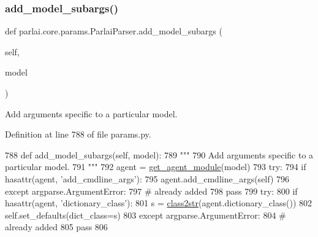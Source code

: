 \subsubsection{\texorpdfstring{add\+\_\+model\+\_\+subargs()}{add\_model\_subargs()}}
{\footnotesize\ttfamily def parlai.\+core.\+params.\+Parlai\+Parser.\+add\+\_\+model\+\_\+subargs (\begin{DoxyParamCaption}\item[{}]{self,  }\item[{}]{model }\end{DoxyParamCaption})}

\begin{DoxyVerb}Add arguments specific to a particular model.
\end{DoxyVerb}
 

Definition at line 788 of file params.\+py.


\begin{DoxyCode}
788     \textcolor{keyword}{def }add\_model\_subargs(self, model):
789         \textcolor{stringliteral}{"""}
790 \textcolor{stringliteral}{        Add arguments specific to a particular model.}
791 \textcolor{stringliteral}{        """}
792         agent = \hyperlink{namespaceparlai_1_1core_1_1agents_a14a9d134d76ffd0509e50703d0f2c949}{get\_agent\_module}(model)
793         \textcolor{keywordflow}{try}:
794             \textcolor{keywordflow}{if} hasattr(agent, \textcolor{stringliteral}{'add\_cmdline\_args'}):
795                 agent.add\_cmdline\_args(self)
796         \textcolor{keywordflow}{except} argparse.ArgumentError:
797             \textcolor{comment}{# already added}
798             \textcolor{keywordflow}{pass}
799         \textcolor{keywordflow}{try}:
800             \textcolor{keywordflow}{if} hasattr(agent, \textcolor{stringliteral}{'dictionary\_class'}):
801                 s = \hyperlink{namespaceparlai_1_1core_1_1params_a4abab85fb7a745de31fcc73de5840a60}{class2str}(agent.dictionary\_class())
802                 self.set\_defaults(dict\_class=s)
803         \textcolor{keywordflow}{except} argparse.ArgumentError:
804             \textcolor{comment}{# already added}
805             \textcolor{keywordflow}{pass}
806 
\end{DoxyCode}
\mbox{\label{classparlai_1_1core_1_1params_1_1ParlaiParser_a6043b5b5c36f99f85a9791dd8dc35551}} 

